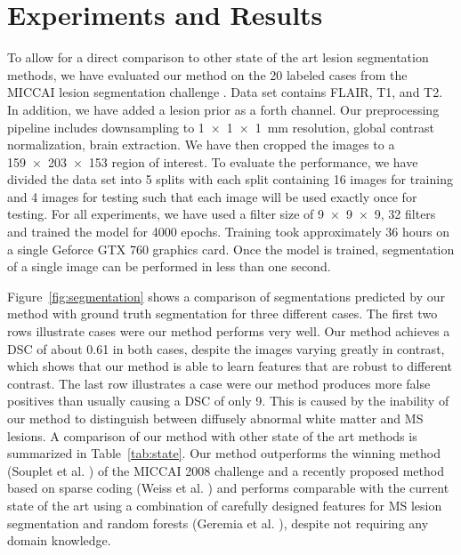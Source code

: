 %

\section{Experiments and Results}

To allow for a direct comparison to other state of the art lesion segmentation
methods, we have evaluated our method on the 20 labeled cases from the MICCAI
lesion segmentation challenge \cite{styner20083d}. Data set contains FLAIR, T1,
and T2. In addition, we have added a lesion prior as a forth channel.
 Our preprocessing pipeline includes
downsampling to \SI{1x1x1}{\milli\metre} resolution, global contrast
normalization, brain extraction. We have then cropped the images to a
\num{159x203x153} region of interest. To evaluate the performance, we have
divided the data set into 5 splits with each split containing 16 images for
training and 4 images for testing such that each image will be used exactly once
for testing. For all experiments, we have used a filter size of \num{9x9x9}, 32
filters and trained the model for 4000 epochs. Training took approximately 36
hours on a single Geforce GTX 760 graphics card. Once the model is trained,
segmentation of a single image can be performed in less than one
second.

Figure~\ref{fig:segmentation} shows a comparison of segmentations predicted by
our method with ground truth segmentation for three different cases. The first
two rows illustrate cases were our method performs very well. Our method
achieves a DSC of about 0.61 in both cases, despite the images varying greatly
in contrast, which shows that our method is able to learn features that are
robust to different contrast. The last row illustrates a case were our method
produces more false positives than usually causing a DSC of only 9. This is
caused by the inability of our method to distinguish between diffusely abnormal
white matter and MS lesions.  A comparison of our
method with other state of the art methods is summarized in
Table~\ref{tab:state}. Our method outperforms the winning method (Souplet et al.
\cite{souplet2008}) of the MICCAI 2008 challenge and a recently proposed method
based on sparse coding (Weiss et al. \cite{weiss2013}) and performs comparable
with the current state of the art using a combination of carefully designed
features for MS lesion segmentation and random forests (Geremia et al.
\cite{geremia2010}), despite not requiring any domain knowledge.


